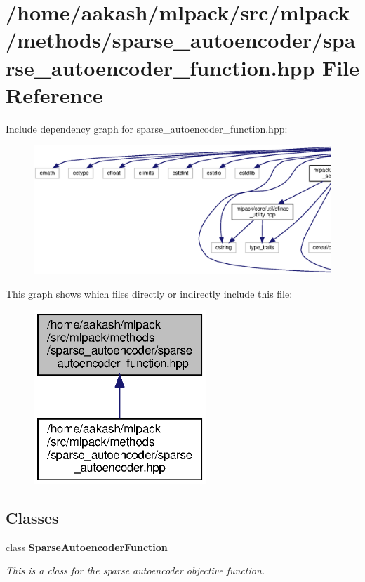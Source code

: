 \section{/home/aakash/mlpack/src/mlpack/methods/sparse\+\_\+autoencoder/sparse\+\_\+autoencoder\+\_\+function.hpp File Reference}
\label{sparse__autoencoder__function_8hpp}
Include dependency graph for sparse\+\_\+autoencoder\+\_\+function.\+hpp\+:
\nopagebreak
\begin{figure}[H]
\begin{center}
\leavevmode
\includegraphics[width=350pt]{sparse__autoencoder__function_8hpp__incl}
\end{center}
\end{figure}
This graph shows which files directly or indirectly include this file\+:
\nopagebreak
\begin{figure}[H]
\begin{center}
\leavevmode
\includegraphics[width=184pt]{sparse__autoencoder__function_8hpp__dep__incl}
\end{center}
\end{figure}
\subsection*{Classes}
\begin{DoxyCompactItemize}
\item 
class \textbf{ Sparse\+Autoencoder\+Function}
\begin{DoxyCompactList}\small\item\em This is a class for the sparse autoencoder objective function. \end{DoxyCompactList}\end{DoxyCompactItemize}
